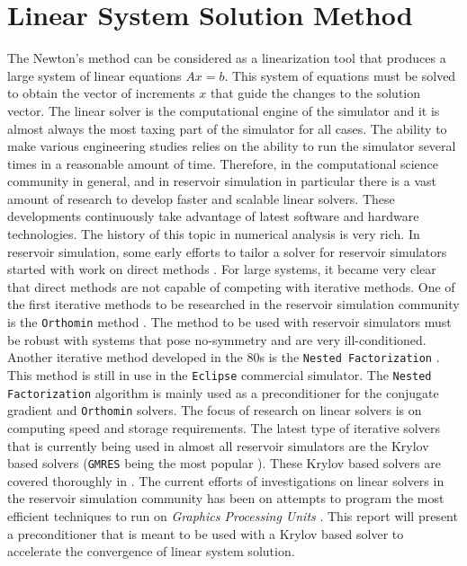 \section{Linear System Solution Method}
The Newton's method can be considered as a linearization tool that produces a large system of linear equations $Ax = b$.
This system of equations must be solved to obtain the vector of increments $x$ that guide the changes to the solution vector.
The linear solver is the computational engine of the simulator and it is almost always the most taxing part of the simulator
for all cases. The ability to make various engineering studies relies on the ability to run the simulator several times in a 
reasonable amount of time. Therefore, in the computational science community in general, and in reservoir simulation in particular 
there is a vast amount of research to develop faster and scalable linear solvers. These developments continuously take advantage of
latest software and hardware technologies. The history of this topic in numerical analysis is very rich. In reservoir simulation,
some early efforts to tailor a solver for reservoir simulators started with work on direct methods \cite{direct}.
For large systems, it became very clear that direct methods are not capable of competing with iterative methods.
One of the first iterative methods to be researched in the reservoir simulation community is the \texttt{Orthomin} method \cite{orthomin}.
The method to be used with reservoir simulators must be robust with systems that pose no-symmetry and are very ill-conditioned.
Another iterative method developed in the 80s is the \texttt{Nested Factorization} \cite{nested}. This method is still in use in the 
\texttt{Eclipse} commercial simulator. The \texttt{Nested Factorization} algorithm is mainly used as a preconditioner for the conjugate gradient
and \texttt{Orthomin} solvers. The focus of research on linear solvers is on computing speed and storage requirements. 
The latest type of iterative solvers that is currently being used in almost all reservoir simulators are the Krylov based solvers (\texttt{GMRES} being the most popular \cite{gmres}).
These Krylov based solvers are covered thoroughly in \cite{saad}. The current efforts of investigations on linear solvers in the reservoir simulation community
has been on attempts to program the most efficient techniques to run on \textit{Graphics Processing Units} \cite{appleyardgpu, gpunested}.
This report will present a preconditioner that is meant to be used with a Krylov based solver to accelerate the convergence of linear system solution.
